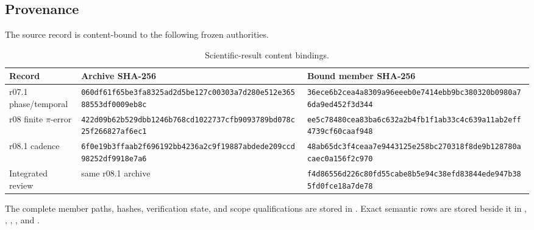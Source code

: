 \subsection{Provenance}\label{manual:phase-temporal:provenance}
The source record is content-bound to the following frozen authorities.
\begin{table}[H]
\centering
\scriptsize
\caption{Scientific-result content bindings.}
\begin{tabularx}{\textwidth}{lXX}
\toprule
Record & Archive SHA-256 & Bound member SHA-256\\
\midrule
r07.1 phase/temporal & \texttt{060df61f\allowbreak 65be3fa8\allowbreak 325ad2d5\allowbreak be127c00\allowbreak 303a7d28\allowbreak 0e512e36\allowbreak 588553df\allowbreak 0009eb8c} & \texttt{36ece6b2\allowbreak cea4a830\allowbreak 9a96eeeb\allowbreak 0e7414eb\allowbreak b9bc3803\allowbreak 20b0980a\allowbreak 76da9ed4\allowbreak 52f3d344}\\
r08 finite \(\pi\)-error & \texttt{422d09b6\allowbreak 2b529dbb\allowbreak 1246b768\allowbreak cd102273\allowbreak 7cfb9093\allowbreak 789bd078\allowbreak c25f2668\allowbreak 27af6ec1} & \texttt{ee5c7848\allowbreak 0cea83ba\allowbreak 6c632a2b\allowbreak 4fb1f1ab\allowbreak 33c4c639\allowbreak a11ab2ef\allowbreak f4739cf6\allowbreak 0caaf948}\\
r08.1 cadence & \texttt{6f0e19b3\allowbreak ffaab2f6\allowbreak 96192bb4\allowbreak 236a2c9f\allowbreak 19887abd\allowbreak ede209cc\allowbreak d98252df\allowbreak 9918e7a6} & \texttt{48ab65dc\allowbreak 3f4ceaa7\allowbreak e9443125\allowbreak e258bc27\allowbreak 0318f8de\allowbreak 9b128780\allowbreak acaec0a1\allowbreak 56f2c970}\\
Integrated review & same r08.1 archive & \texttt{f4d86556\allowbreak d226c80f\allowbreak d55cabe8\allowbreak b5e94c38\allowbreak efd83844\allowbreak ede947b3\allowbreak 85fd0fce\allowbreak 18a7de78}\\
\bottomrule
\end{tabularx}
\label{tab:manual-phase-temporal-provenance}
\end{table}

The complete member paths, hashes, verification state, and scope qualifications are stored in . Exact semantic rows are stored beside it in , , , , and .

